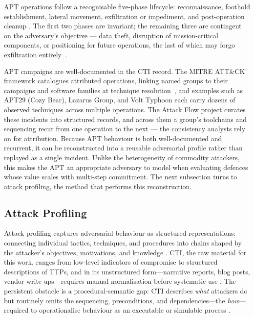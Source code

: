APT operations follow a recognisable five-phase lifecycle:
reconnaissance, foothold establishment, lateral movement,
exfiltration or impediment, and post-operation cleanup
\cite{alshamrani2019}. The first two phases are invariant; the
remaining three are contingent on the adversary's objective ---
data theft, disruption of mission-critical components, or
positioning for future operations, the last of which may forgo
exfiltration entirely~\cite{alshamrani2019}.

APT campaigns are well-documented in the CTI record. The MITRE
ATT\&CK framework catalogues attributed operations, linking named
groups to their campaigns and software families at technique
resolution~\cite{alsada2024}, and examples such as
APT29 (Cozy Bear), Lazarus Group, and Volt Typhoon each carry dozens
of observed techniques across multiple operations. The Attack Flow
project \cite{ctid2025attackflow} curates these incidents into
structured records, and across them a group's toolchains and
sequencing recur from one operation to the next --- the consistency
analysts rely on for attribution. Because APT behaviour is both
well-documented and recurrent, it can be reconstructed into a
reusable adversarial profile rather than replayed as a single
incident. Unlike the heterogeneity of commodity attackers, this
makes the APT an appropriate adversary to model when evaluating
defences whose value scales with multi-step commitment. The next
subsection turns to attack profiling, the method that performs this
reconstruction.

\subsection{Attack Profiling}
\label{subsec:cti_profiling}

Attack profiling captures adversarial behaviour as structured representations: connecting individual tactics, techniques, and procedures into chains shaped by the attacker's objectives, motivations, and knowledge \cite{rodriguez2024}. CTI, the raw material for this work, ranges from low-level indicators of compromise to structured descriptions of TTPs, and in its unstructured form---narrative reports, blog posts, vendor write-ups---requires manual normalisation before systematic use \cite{ferraz2026}. The persistent obstacle is a procedural-semantic gap: CTI describes \emph{what} attackers do but routinely omits the sequencing, preconditions, and dependencies---the \emph{how}---required to operationalise behaviour as an executable or simulable process \cite{ferraz2026}.

